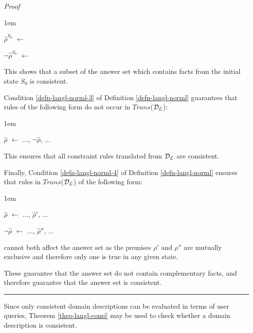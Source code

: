 \documentclass[11pt]{report}
\newenvironment{vproof}
{
  \noindent
  {\em Proof}\hspace{0.5em}
}
{

  \noindent
  \rule{0.5em}{0.5em}
}
\newenvironment{vquote}
{
  \begin{list}{}{\leftmargin 1em}\item[]
}
{
  \end{list}
}
\begin{document}
\begin{vproof}
        \begin{vquote}
          $\hat{\rho}^{S_{0}}$ $\leftarrow$

          $\lnot\hat{\rho}^{S_{0}}$ $\leftarrow$
        \end{vquote}

        \noindent
        This shows that a subset of the answer set which contains facts from
        the initial state $S_{0}$ is consistent.

        Condition \ref{defn-langl-norml-3} of Definition \ref{defn-langl-norml}
        guarantees that rules of the following form do not occur in
        $Trans$(${\cal D}_{\cal L}$):

        \begin{vquote}
          $\hat{\rho}$ $\leftarrow$ $\hdots$, $\lnot\hat{\rho}$, $\hdots$
        \end{vquote}

        \noindent
        This ensures that all constraint rules translated from
        ${\cal D}_{\cal L}$ are consistent.

        Finally, Condition \ref{defn-langl-norml-4} of Definition
        \ref{defn-langl-norml} ensures that rules in
        $Trans$(${\cal D}_{\cal L}$) of the following form:

        \begin{vquote}
          $\hat{\rho}$ $\leftarrow$ $\hdots$, $\hat{\rho}'$, $\hdots$

          $\lnot \hat{\rho}$ $\leftarrow$ $\hdots$, $\hat{\rho}''$, $\hdots$
        \end{vquote}

        \noindent
        cannot both affect the answer set as the premises $\rho'$ and $\rho''$
        are mutually exclusive and therefore only one is true in any given
        state.

        These guarantee that the answer set do not contain complementary facts,
        and therefore guarantee that the answer set is consistent.
      \end{vproof}

      Since only consistent domain descriptions can be evaluated in terms of
      user queries, Theorem \ref{theo-langl-consi} may be used to check whether
      a domain description is consistent.
\end{document}
